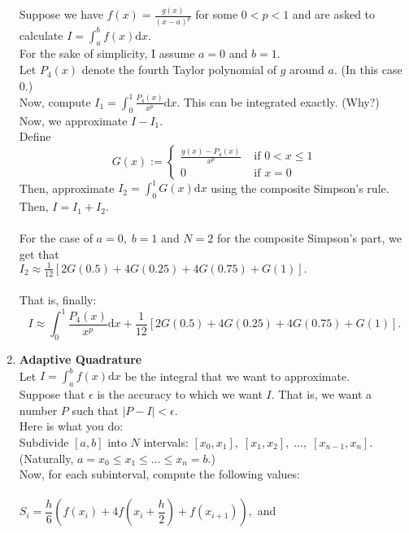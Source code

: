 \documentclass{article}
\begin{document}
\begin{enumerate}
	Suppose we have $f(x) = \frac{g(x)}{(x - a)^p}$ for some $0 < p < 1$ and are asked to calculate $I = \displaystyle\int_{a}^{b} f(x) \text{d}x.$\\
	For the sake of simplicity, I assume $a = 0$ and $b = 1.$\\
	Let $P_4(x)$ denote the fourth Taylor polynomial of $g$ around $a.$ (In this case $0$.)\\
	Now, compute $I_1 = \displaystyle\int_{0}^{1} \frac{P_4(x)}{x^p} \text{d}x.$ This can be integrated exactly. \hfill (Why?)\\
	Now, we approximate $I - I_1.$\\
	Define
	\[G(x) := \left\{\begin{array}{ll}
		\frac{g(x) - P_4(x)}{x^p} & \text{ if } 0 < x \le 1\\
		0 & \text{ if } x = 0
	\end{array}
	\right.\]
	Then, approximate $I_2 = \displaystyle\int_{0}^{1} G(x) \text{d}x$ using the composite Simpson's rule.\\
	Then, $I = I_1 + I_2.$\\~\\
	For the case of $a = 0,\; b = 1$ and $N = 2$ for the composite Simpson's part, we get that \\
	$I_2 \approx \frac{1}{12}[2G(0.5) + 4G(0.25) + 4G(0.75) + G(1)].$\\~\\
	That is, finally:
	\[I \approx \int_{0}^{1} \frac{P_4(x)}{x^p} \text{d}x + \frac{1}{12}[2G(0.5) + 4G(0.25) + 4G(0.75) + G(1)].\]
	\item \textbf{Adaptive Quadrature}\\
	Let $I = \displaystyle\int_{a}^{b} f(x) \text{d}x$ be the integral that we want to approximate.\\
	Suppose that $\epsilon$ is the accuracy to which we want $I.$ That is, we want a number $P$ such that $|P - I| < \epsilon.$\\
	Here is what you do:\\
	Subdivide $[a, b]$ into $N$ intervals: $[x_0, x_1],\;[x_1, x_2],\;\ldots,\;[x_{n-1}, x_n].$ (Naturally, $a = x_0 \le x_1 \le \ldots \le x_n = b$.)\\
	Now, for each subinterval, compute the following values:\\~\\
	$S_i = \dfrac{h}{6}\left(f(x_i) + 4f\left(x_i + \dfrac{h}{2}\right) + f\left(x_{i+1}\right)\right),$ and\\~\\

\end{enumerate}
\end{document}
